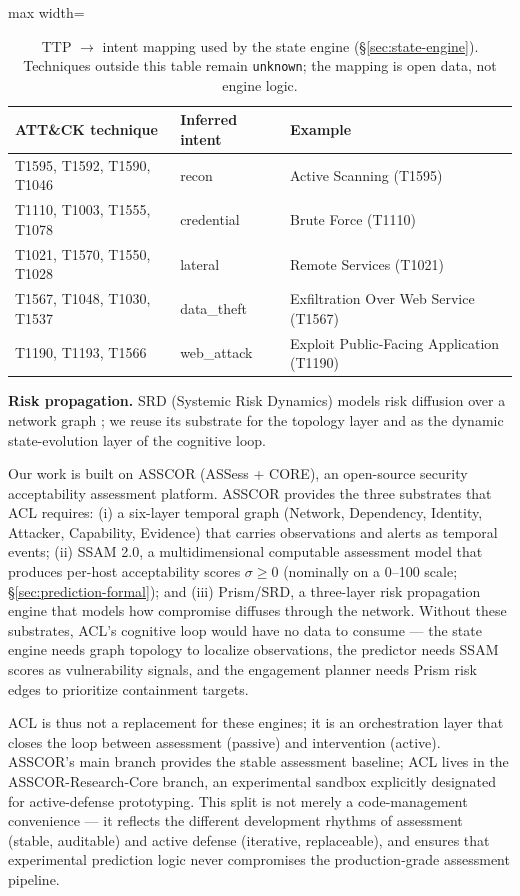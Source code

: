 \documentclass[11pt]{article}
\newcommand{\act}[1]{\texttt{#1}}
\begin{document}
\begin{table}[ht]
\centering
\begin{adjustbox}{max width=\linewidth}\begin{tabular}{@{}lll@{}}
\toprule
\textbf{ATT\&CK technique} & \textbf{Inferred intent} & \textbf{Example} \\
\midrule
T1595, T1592, T1590, T1046 & recon & Active Scanning (T1595) \\
T1110, T1003, T1555, T1078 & credential & Brute Force (T1110) \\
T1021, T1570, T1550, T1028 & lateral & Remote Services (T1021) \\
T1567, T1048, T1030, T1537 & data\_theft & Exfiltration Over Web Service (T1567) \\
T1190, T1193, T1566 & web\_attack & Exploit Public-Facing Application (T1190) \\
\bottomrule
\end{tabular}\end{adjustbox}
\caption{TTP $\rightarrow$ intent mapping used by the state engine
(\S\ref{sec:state-engine}). Techniques outside this table remain
\act{unknown}; the mapping is open data, not engine logic.}
\label{tab:ttp-intent}
\end{table}

\textbf{Risk propagation.} SRD (Systemic Risk Dynamics) models risk
diffusion over a network graph \cite{asscor-wp}; we reuse its substrate for
the topology layer and as the dynamic state-evolution layer of the
cognitive loop.

Our work is built on ASSCOR (ASSess + CORE), an open-source security acceptability assessment platform. ASSCOR provides the three substrates that ACL requires: (i) a six-layer temporal graph (Network, Dependency, Identity, Attacker, Capability, Evidence) that carries observations and alerts as temporal events; (ii) SSAM 2.0, a multidimensional computable assessment model that produces per-host acceptability scores $\sigma \ge 0$ (nominally on a 0--100 scale; \S\ref{sec:prediction-formal}); and (iii) Prism/SRD, a three-layer risk propagation engine that models how compromise diffuses through the network. Without these substrates, ACL's cognitive loop would have no data to consume --- the state engine needs graph topology to localize observations, the predictor needs SSAM scores as vulnerability signals, and the engagement planner needs Prism risk edges to prioritize containment targets.

ACL is thus not a replacement for these engines; it is an orchestration layer that closes the loop between assessment (passive) and intervention (active). ASSCOR's main branch provides the stable assessment baseline; ACL lives in the ASSCOR-Research-Core branch, an experimental sandbox explicitly designated for active-defense prototyping. This split is not merely a code-management convenience --- it reflects the different development rhythms of assessment (stable, auditable) and active defense (iterative, replaceable), and ensures that experimental prediction logic never compromises the production-grade assessment pipeline.
\end{document}
